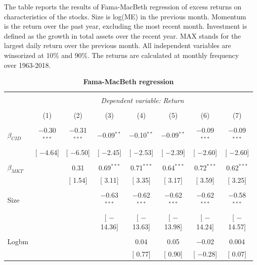 \documentclass[12pt]{article}
\begin{document}
\begin{table}[!htbp] \centering 
  \caption{\textbf{Fama-MacBeth regression}} 
  \label{} 
  \begin{flushleft}
    {\medskip\small
 The table reports the results of Fama-MacBeth regression of excess returns on characteristics of the stocks. Size is log(ME) in the previous month. Momentum is the return over the past year, excluding the most recent month. Investment is defined as the growth in total assets over the recent year. MAX stands for the largest daily return over the previous month. All independent variables are winsorized at 10\% and 90\%. The returns are calculated at monthly frequency over 1963-2018.}
    \medskip
    \end{flushleft}
\begin{tabular}{@{\extracolsep{0pt}}lccccccc} 
\\[-1.8ex]\hline 
\hline \\[-1.8ex] 
 & \multicolumn{7}{c}{\textit{Dependent variable: Return}} \\ 
\cline{2-8} 
\\[-1.8ex] & (1) & (2) & (3) & (4) & (5) & (6) & (7)\\ 
\hline \\[-1.8ex] 
 $\beta_{CID}$ & $-$0.30$^{***}$ & $-$0.31$^{***}$ & $-$0.09$^{**}$ & $-$0.10$^{**}$ & $-$0.09$^{**}$ & $-$0.09$^{***}$ & $-$0.09$^{***}$ \\ 
  & [ $-$4.64] & [ $-$6.50] & [ $-$2.45] & [ $-$2.53] & [ $-$2.39] & [ $-$2.60] & [ $-$2.60] \\ 
  & & & & & & & \\ 
 $\beta_{MKT}$ &  & 0.31 & 0.69$^{***}$ & 0.71$^{***}$ & 0.64$^{***}$ & 0.72$^{***}$ & 0.62$^{***}$ \\ 
  &  & [ 1.54] & [ 3.11] & [ 3.35] & [ 3.17] & [ 3.59] & [ 3.25] \\ 
  & & & & & & & \\ 
 Size &  &  & $-$0.63$^{***}$ & $-$0.62$^{***}$ & $-$0.62$^{***}$ & $-$0.62$^{***}$ & $-$0.58$^{***}$ \\ 
  &  &  & [ $-$14.36] & [ $-$13.63] & [ $-$13.98] & [ $-$14.24] & [ $-$14.57] \\ 
  & & & & & & & \\ 
 Logbm &  &  &  & 0.04 & 0.05 & $-$0.02 & 0.004 \\ 
  &  &  &  & [ 0.77] & [ 0.90] & [ $-$0.28] & [ 0.07] \\ 

\end{tabular}
\end{table}
\end{document}
